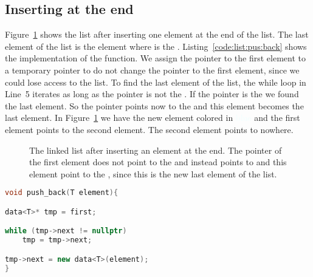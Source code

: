 \documentclass[11pt,fleqn]{book} %
\begin{document}
\subsection*{Inserting at the end}

Figure~\ref{fig:sketch:linked:list:push_back} shows the list after inserting one element at the end of the list. The last element of the list is the element where  is the . Listing~\ref{code:list:pus:back} shows the implementation of the  function. We assign the pointer to the first element to a temporary pointer  to do not change the pointer to the first element, since we could lose access to the list. To find the last element of the list, the while loop in Line~5 iterates as long as the  pointer is not the . If the  pointer is the  we found the last element. So the  pointer points now to the  and this element becomes the last element. In Figure~\ref{fig:sketch:linked:list:push_back} we have the new element colored in \textcolor{azure}{blue} and the first element points to the second element. The second element points to nowhere.

\begin{figure}[h]
\centering
{}
\caption{The linked list after inserting an element at the end. The pointer  of the first element does not point to the  and instead points to  and this element point to the , since this is the new last element of the list.}
\label{fig:sketch:linked:list:push_back}
\end{figure}

\begin{lstlisting}[language=c++,caption={Implementation of the \cpp{push_back} function of a linked list.\label{code:list:pus:back}},float,floatplacement=tb]
void push_back(T element){

data<T>* tmp = first;

while (tmp->next != nullptr)
    tmp = tmp->next;

tmp->next = new data<T>(element);
}
\end{lstlisting}
\end{document}
